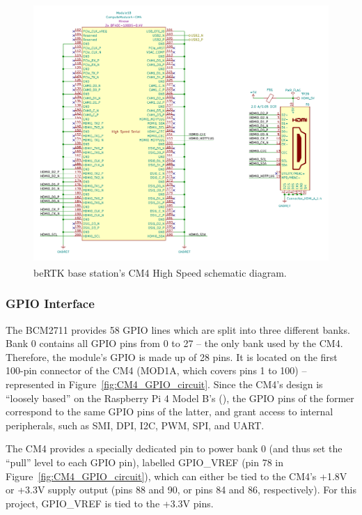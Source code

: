 \begin{figure}[h]
	\centering
	\includegraphics[width=1.0\textwidth]{Chapters/Figures/chapter3/CM4_HighSpeed.pdf}
	\caption{beRTK\textsuperscript{\textregistered} base station's CM4 High Speed schematic diagram.}
	\label{fig:CM4_HighSpeed_circuit}
\end{figure}


\subsubsection{GPIO Interface}\label{sec:3222_CM4_GPIO}

The BCM2711 provides 58 GPIO lines which are split into three different banks. Bank 0 contains all GPIO pins from 0 to 27 -- the only bank used by the CM4. Therefore, the module's GPIO is made up of 28 pins. It is located on the first 100-pin connector of the CM4 (MOD1A, which covers pins 1 to 100) -- represented in Figure~\ref{fig:CM4_GPIO_circuit}. Since the CM4's design is ``loosely based'' on the Raspberry Pi 4 Model B's (\cite{CM4}), the GPIO pins of the former correspond to the same GPIO pins of the latter, and grant access to internal peripherals, such as SMI, DPI, I2C, PWM, SPI, and UART.

The CM4 provides a specially dedicated pin to power bank 0 (and thus set the ``pull'' level to each GPIO pin), labelled GPIO\_VREF (pin 78 in Figure~\ref{fig:CM4_GPIO_circuit}), which can either be tied to the CM4's +1.8V or +3.3V supply output (pins 88 and 90, or pins 84 and 86, respectively). For this project, GPIO\_VREF is tied to the +3.3V pins.

